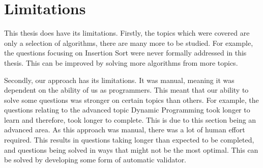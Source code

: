 \documentclass[10pt,twocolumn,hidelinks]{IEEEtran}
\begin{document}

\section{Limitations}
 \par This thesis does have its limitations. Firstly, the topics which were covered are only a selection of algorithms, there are many more to be studied. For example, the questions focusing on Insertion Sort were never formally addressed in this thesis. This can be improved by solving more algorithms from more topics.
 \par Secondly, our approach has its limitations. It was manual, meaning it was dependent on the ability of us as programmers. This meant that our ability to solve some questions was stronger on certain topics than others. For example, the questions relating to the advanced topic Dynamic Programming took longer to learn and therefore, took longer to complete. This is due to this section being an advanced area. As this approach was manual, there was a lot of human effort required. This results in questions taking longer than expected to be completed, and questions being solved in ways that might not be the most optimal. This can be solved by developing some form of automatic validator.
\end{document}

